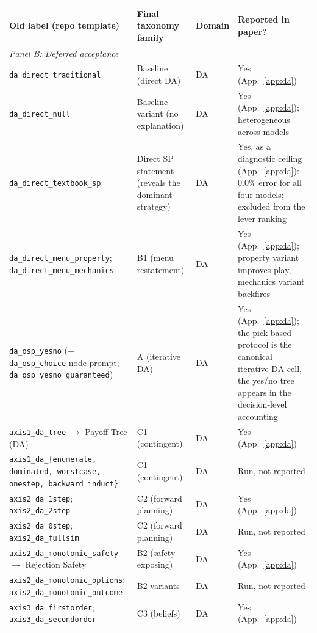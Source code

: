 \begin{table}[p]
\centering
\footnotesize
\setlength{\tabcolsep}{4pt}
\begin{tabular}{p{4.9cm} p{3.3cm} p{1.0cm} p{4.4cm}}
\toprule
\textbf{Old label (repo template)} & \textbf{Final taxonomy family} & \textbf{Domain} & \textbf{Reported in paper?} \\
\midrule
\multicolumn{4}{l}{\emph{Panel B: Deferred acceptance}} \\
\midrule
\texttt{da\_direct\_traditional} & Baseline (direct DA) & DA & Yes (App.~\ref{app:da}) \\
\texttt{da\_direct\_null} & Baseline variant (no explanation) & DA & Yes (App.~\ref{app:da}); heterogeneous across models \\
\texttt{da\_direct\_textbook\_sp} & Direct SP statement (reveals the dominant strategy) & DA & Yes, as a diagnostic ceiling (App.~\ref{app:da}): $0.0\%$ error for all four models; excluded from the lever ranking \\
\texttt{da\_direct\_menu\_property}; \texttt{da\_direct\_menu\_mechanics} & B1 (menu restatement) & DA & Yes (App.~\ref{app:da}); property variant improves play, mechanics variant backfires \\
\texttt{da\_osp\_yesno} (+ \texttt{da\_osp\_choice} node prompt; \texttt{da\_osp\_yesno\_guaranteed}) & A (iterative DA) & DA & Yes (App.~\ref{app:da}); the pick-based protocol is the canonical iterative-DA cell, the yes/no tree appears in the decision-level accounting \\
\texttt{axis1\_da\_tree} $\to$ Payoff Tree (DA) & C1 (contingent) & DA & Yes (App.~\ref{app:da}) \\
\texttt{axis1\_da\_\{enumerate, dominated, worstcase, onestep, backward\_induct\}} & C1 (contingent) & DA & Run, not reported \\
\texttt{axis2\_da\_1step}; \texttt{axis2\_da\_2step} & C2 (forward planning) & DA & Yes (App.~\ref{app:da}) \\
\texttt{axis2\_da\_0step}; \texttt{axis2\_da\_fullsim} & C2 (forward planning) & DA & Run, not reported \\
\texttt{axis2\_da\_monotonic\_safety} $\to$ Rejection Safety & B2 (safety-exposing) & DA & Yes (App.~\ref{app:da}) \\
\texttt{axis2\_da\_monotonic\_options}; \texttt{axis2\_da\_monotonic\_outcome} & B2 variants & DA & Run, not reported \\
\texttt{axis3\_da\_firstorder}; \texttt{axis3\_da\_secondorder} & C3 (beliefs) & DA & Yes (App.~\ref{app:da}) \\

\end{tabular}
\end{table}
